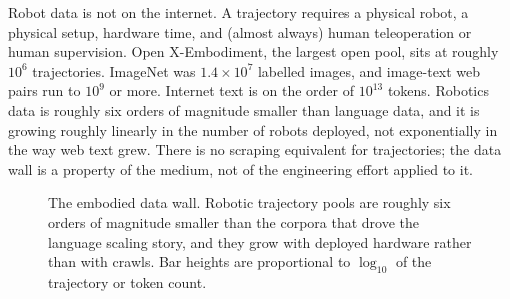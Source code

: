  Robot data is not on the internet. A trajectory requires a physical robot, a physical setup, hardware time, and (almost always) human teleoperation or human supervision. Open X-Embodiment, the largest open pool, sits at roughly $10^6$ trajectories. ImageNet was $1.4 \times 10^7$ labelled images, and image-text web pairs run to $10^9$ or more. Internet text is on the order of $10^{13}$ tokens. Robotics data is roughly six orders of magnitude smaller than language data, and it is growing roughly linearly in the number of robots deployed, not exponentially in the way web text grew. There is no scraping equivalent for trajectories; the data wall is a property of the medium, not of the engineering effort applied to it.

\begin{figure}
\centering
{}
\caption{The embodied data wall. Robotic trajectory pools are roughly six orders of magnitude smaller than the corpora that drove the language scaling story, and they grow with deployed hardware rather than with crawls. Bar heights are proportional to $\log_{10}$ of the trajectory or token count.}
\label{fig:data_wall}
\end{figure}

